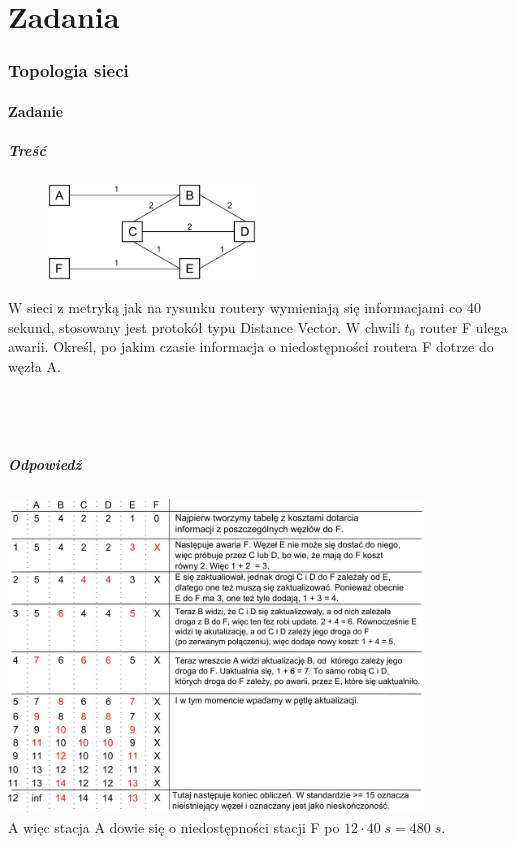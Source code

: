 
\newpage
\part{Zadania}
\section{Topologia sieci}
	\subsection{Zadanie}
		\subsubsection{Treść}
			\begin{figure}
				\includegraphics[width=5.5cm]{./images/zadanie02.pdf}
			\end{figure} 
			W sieci z metryką jak na rysunku routery wymieniają się informacjami co 40 sekund, stosowany jest protokół typu Distance Vector. W chwili $ t_0 $ router F ulega awarii. Określ, po jakim czasie informacja o niedostępności routera F dotrze do węzła A.\\\\\\\\
		\subsubsection{Odpowiedź}
			\includegraphics[width=11.0cm]{./images/zadanie03.pdf}\\
			A więc stacja A dowie się o niedostępności stacji F po $ 12\cdot 40\;s=480\;s $.
